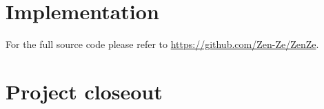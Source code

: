 \documentclass{sigchi}
\begin{document}
\section{Implementation}
For the full source code please refer to \url{https://github.com/Zen-Ze/ZenZe}.
\section{Project closeout}

%
%
%
%
%
\end{document}
